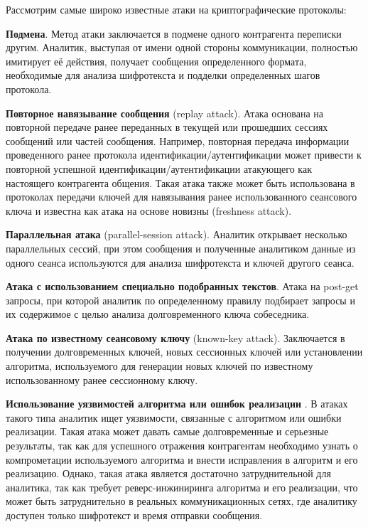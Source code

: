 	Рассмотрим самые широко известные  атаки на криптографические протоколы: %
	
	
	\textbf{Подмена}. Метод атаки заключается в подмене одного контрагента переписки другим. Аналитик,  выступая от имени одной стороны коммуникации, полностью имитирует её действия, получает сообщения определенного формата, необходимые для анализа шифротекста и подделки определенных шагов протокола.
	
	\textbf{Повторное навязывание сообщения} (replay attack). Атака основана на повторной передаче ранее переданных в текущей или прошедших сессиях  сообщений или частей сообщения. Например, повторная передача  информации проведенного ранее протокола идентификации/аутентификации может привести к повторной успешной идентификации/аутентификации атакующего как настоящего контрагента общения. Такая атака также может быть использована в протоколах передачи ключей для навязывания ранее использованного сеансового ключа и известна как атака на основе новизны (freshness attack).
	
	\textbf{Параллельная атака} (parallel-session attack). Аналитик открывает несколько параллельных сессий, при этом сообщения и полученные аналитиком  данные  из одного сеанса используются для   анализа шифротекста и ключей другого сеанса.
	
	\textbf{Атака с использованием специально подобранных текстов}. Атака на post-get запросы, при которой аналитик по определенному правилу подбирает запросы и их содержимое с целью анализа долговременного ключа собеседника.
	
	\textbf{Атака по известному сеансовому ключу} (known-key attack). Заключается в получении долговременных ключей, новых сессионных ключей или установлении алгоритма, используемого для генерации новых ключей по известному использованному ранее сессионному ключу.
	
	\textbf{Использование уязвимостей  алгоритма или ошибок реализации }. 	В атаках такого типа аналитик ищет уязвимости, связанные с алгоритмом или ошибки реализации. Такая атака может давать самые долговременные и серьезные результаты, так как для успешного отражения контрагентам необходимо узнать о компрометации используемого алгоритма и внести исправления в алгоритм и его реализацию. Однако, такая атака является достаточно затруднительной для аналитика, так как требует реверс-инжиниринга  алгоритма и его реализации, что может быть затруднительно в реальных коммуникационных сетях, где аналитику доступен только шифротекст и время отправки сообщения.\\
	
